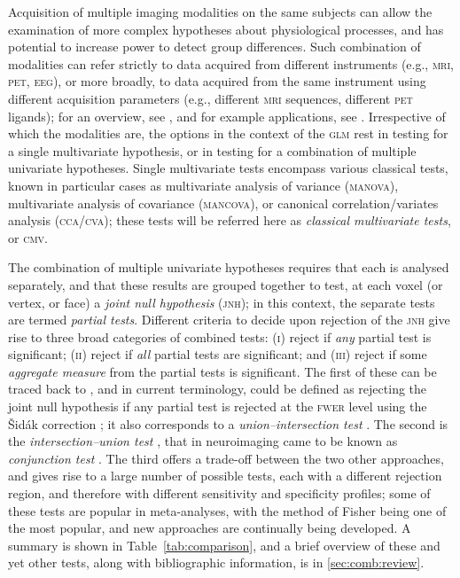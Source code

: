 Acquisition of multiple imaging modalities on the same subjects can allow the examination of more complex hypotheses about physiological processes, and has potential to increase power to detect group differences. Such combination of modalities can refer strictly to data acquired from different instruments (e.g., \textsc{mri}, \textsc{pet}, \textsc{eeg}), or more broadly, to data acquired from the same instrument using different acquisition parameters (e.g., different \textsc{mri} sequences, different \textsc{pet} ligands); for an overview, see \citet{Uludag2014,Zhu2014,Calhoun2016}, and for example applications, see \citet{Hayasaka2006, Thomas2016}. Irrespective of which the modalities are, the options in the context of the \textsc{glm} rest in testing for a single multivariate hypothesis, or in testing for a combination of multiple univariate hypotheses. Single multivariate tests encompass various classical tests, known in particular cases as multivariate analysis of variance (\textsc{manova}), multivariate analysis of covariance (\textsc{mancova}), or canonical correlation/variates analysis (\textsc{cca}/\textsc{cva}); these tests will be referred here as \emph{classical multivariate tests}, or \textsc{cmv}.

The combination of multiple univariate hypotheses requires that each is analysed separately, and that these results are grouped together to test, at each voxel (or vertex, or face) a \emph{joint null hypothesis} (\textsc{jnh}); in this context, the separate tests are termed \emph{partial tests}. Different criteria to decide upon rejection of the \textsc{jnh} give rise to three broad categories of combined tests: (\textsc{i}) reject if \emph{any} partial test is significant; (\textsc{ii}) reject if \emph{all} partial tests are significant; and (\textsc{iii}) reject if some \emph{aggregate measure} from the partial tests is significant. The first of these can be traced back to \citet{Tippett1931}, and in current terminology, could be defined as rejecting the joint null hypothesis if any partial test is rejected at the \textsc{fwer} level using the \v{S}id\'{a}k correction \citep{Sidak1967}; it also corresponds to a \emph{union--intersection test} \citep[\textsc{uit},][]{Roy1953}. The second is the \emph{intersection--union test} \citep[\textsc{iut},][]{Berger1982}, that in neuroimaging came to be known as \emph{conjunction test} \citep{Nichols2005}. The third offers a trade-off between the two other approaches, and gives rise to a large number of possible tests, each with a different rejection region, and therefore with different sensitivity and specificity profiles; some of these tests are popular in meta-analyses, with the method of Fisher \citep{Fisher1932} being one of the most popular, and new approaches are continually being developed. A summary is shown in Table~\ref{tab:comparison}, and a brief overview of these and yet other tests, along with bibliographic information, is in \ref{sec:comb:review}.


